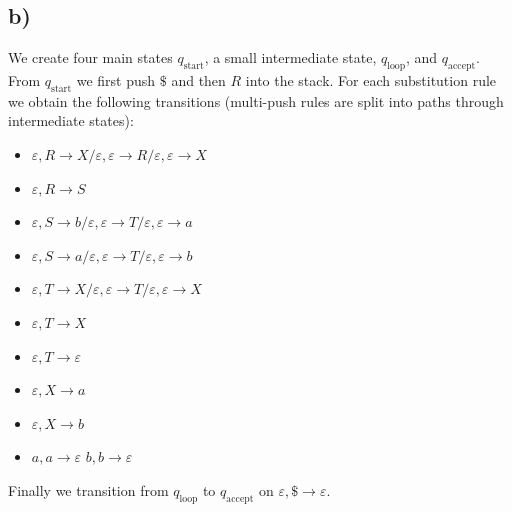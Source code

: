 \documentclass[a4paper, UTF-8]{article}
\theoremstyle{plain}
\begin{document}
\subsection{b)}

We create four main states $q_{\text{start}}$, a small intermediate state, $q_{\text{loop}}$, and $q_{\text{accept}}$. From $q_{\text{start}}$ we first push $\$$ and then $R$ into the stack. For each substitution rule we obtain the following transitions (multi-push rules are split into paths through intermediate states):
\begin{itemize}
    \item $\varepsilon, R \to X / \varepsilon, \varepsilon \to R / \varepsilon, \varepsilon \to X$
    \item $\varepsilon, R \to S$
    \item $\varepsilon, S \to b / \varepsilon, \varepsilon \to T / \varepsilon, \varepsilon \to a$
    \item $\varepsilon, S \to a / \varepsilon, \varepsilon \to T / \varepsilon, \varepsilon \to b$
    \item $\varepsilon, T \to X / \varepsilon, \varepsilon \to T / \varepsilon, \varepsilon \to X$
    \item $\varepsilon, T \to X$
    \item $\varepsilon, T \to \varepsilon$
    \item $\varepsilon, X \to a$
    \item $\varepsilon, X \to b$
    \item $a, a \to \varepsilon$ \quad $b, b \to \varepsilon$
\end{itemize}
Finally we transition from $q_{\text{loop}}$ to $q_{\text{accept}}$ on $\varepsilon, \$ \to \varepsilon$.
\end{document}
